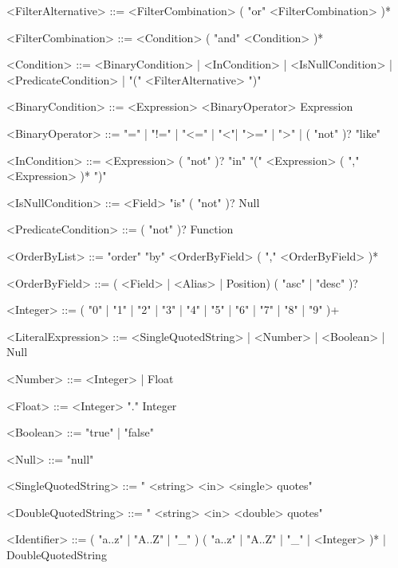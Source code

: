 \begin{grammar}
    <FilterAlternative> ::= <FilterCombination> ( "or" <FilterCombination> )*

    <FilterCombination> ::= <Condition> ( "and" <Condition> )*

    <Condition> ::= <BinaryCondition> | <InCondition> | <IsNullCondition> | <PredicateCondition> | "(" <FilterAlternative> ")"

    <BinaryCondition> ::= <Expression>  <BinaryOperator> Expression

    <BinaryOperator> ::= "=" | "!=" | "<=" | "<"| ">=" | ">" | ( "not" )? "like"

    <InCondition> ::= <Expression> ( "not" )? "in" "(" <Expression> ( "," <Expression> )* ")"

    <IsNullCondition> ::= <Field> "is" ( "not" )? Null

    <PredicateCondition> ::= ( "not" )? Function

    <OrderByList> ::= "order" "by" <OrderByField> ( "," <OrderByField> )*

    <OrderByField> ::= ( <Field> | <Alias> | Position) ( "asc" | "desc" )?

    <Integer> ::= ( "0" | "1" | "2" | "3" | "4" | "5" | "6" | "7" | "8" | "9" )+

    <LiteralExpression> ::= <SingleQuotedString> | <Number> | <Boolean> | Null

    <Number> ::= <Integer> | Float

    <Float> ::= <Integer> "." Integer

    <Boolean> ::= "true" | "false"

    <Null> ::= "null"

    <SingleQuotedString> ::= " <string>  <in>  <single> quotes"

    <DoubleQuotedString> ::= " <string>  <in>  <double> quotes"

    <Identifier> ::= ( "a..z" | "A..Z" | "_" ) ( "a..z" | "A..Z" | "_" | <Integer> )* | DoubleQuotedString
\end{grammar}